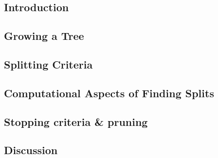 

\subsection{Introduction}


\subsection{Growing a Tree}


\subsection{Splitting Criteria}


\subsection{Computational Aspects of Finding Splits}


\subsection{Stopping criteria \& pruning}


\subsection{Discussion}

